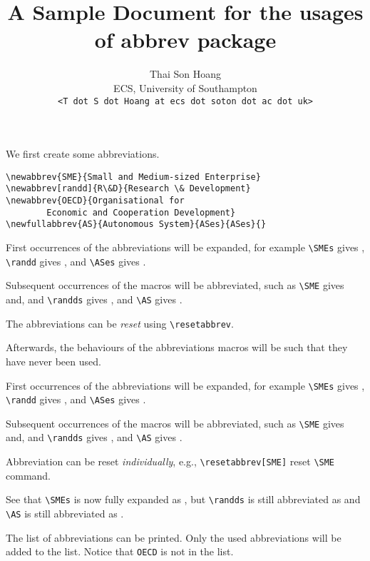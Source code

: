 \usepackage{verbatim}
\title{A Sample Document for the usages of \textsf{abbrev} package}
\author{Thai Son Hoang\\ECS, University of Southampton\\\texttt{<T dot S dot Hoang at ecs dot soton dot ac dot uk>}}


\maketitle

We first create some abbreviations.
\begin{verbatim}
\newabbrev{SME}{Small and Medium-sized Enterprise}
\newabbrev[randd]{R\&D}{Research \& Development}
\newabbrev{OECD}{Organisational for 
        Economic and Cooperation Development}
\newfullabbrev{AS}{Autonomous System}{ASes}{ASes}{}
\end{verbatim}


First occurrences of the abbreviations will be expanded, for example \verb|\SMEs| gives \SMEs, \verb|\randd| gives \randd, and \verb|\ASes| gives \ASes.

Subsequent occurrences of the macros will be abbreviated, such as \verb|\SME| gives \SME and, and \verb|\randds| gives \randds, and \verb|\AS| gives \AS.

The abbreviations can be \emph{reset} using \verb|\resetabbrev|.
\resetabbrev

Afterwards, the behaviours of the abbreviations macros will be such that they have never been used.

First occurrences of the abbreviations will be expanded, for example \verb|\SMEs| gives \SMEs, \verb|\randd| gives \randd, and \verb|\ASes| gives \ASes.

Subsequent occurrences of the macros will be abbreviated, such as \verb|\SME| gives \SME and, and \verb|\randds| gives \randds, and \verb|\AS| gives \AS.
 
Abbreviation can be reset \emph{individually}, e.g., \verb|\resetabbrev[SME]| reset \verb|\SME| command.
\resetabbrev[SME]

See that \verb|\SMEs| is now fully expanded as \SMEs, but \verb|\randds| is still abbreviated as \randds and \verb|\AS| is still abbreviated as \AS.

The list of abbreviations can be printed.  Only the used abbreviations will be added to the list. Notice that \verb|OECD| is not in the list.

\printnomenclature



